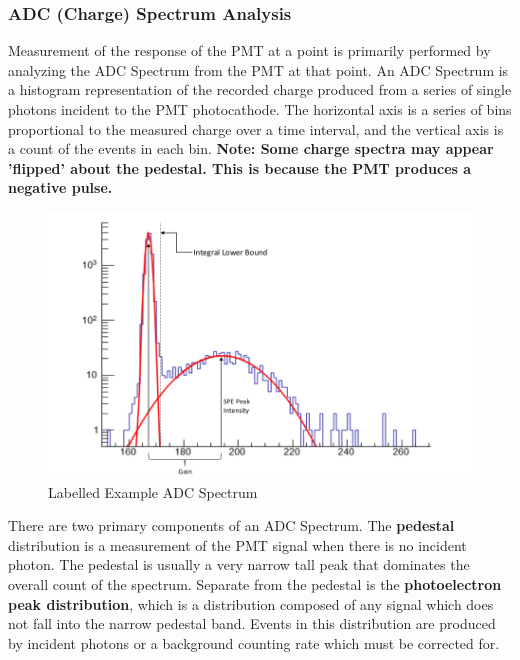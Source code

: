 \documentclass[twoside,letterpaper]{refart}
\begin{document}
\subsubsection{ADC (Charge) Spectrum Analysis}

Measurement of the response of the PMT at a point is primarily performed by analyzing the ADC Spectrum from the PMT at that point.  An ADC Spectrum is a histogram representation of the recorded charge produced from a series of single photons incident to the PMT photocathode. The horizontal axis is a series of bins proportional to the measured charge over a time interval, and the vertical axis is a count of the events in each bin. \textbf{Note:  Some charge spectra may appear 'flipped' about the pedestal.  This is because the PMT produces a negative pulse.}

\FloatBarrier

\begin{figure}[!htpb] 
	\centering	
	\includegraphics[scale=0.35]{images/adcSpectrum}
	\caption{Labelled Example ADC Spectrum}
	\label{adcSpectrum}
\end{figure}

\FloatBarrier

There are two primary components of an ADC Spectrum.  The \textbf{pedestal} distribution is a measurement of the PMT signal when there is no incident photon.  The pedestal is usually a very narrow tall peak that dominates the overall count of the spectrum.  Separate from the pedestal is the \textbf{photoelectron peak distribution}, which is a distribution composed of any signal which does not fall into the narrow pedestal band.  Events in this distribution are produced by incident photons or a background counting rate which must be corrected for.  
\end{document}
